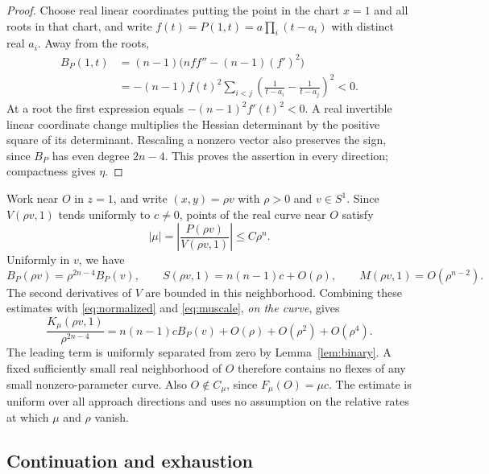 \documentclass[11pt,a4paper]{article}
\theoremstyle{remark}
\begin{document}
\begin{proof}
Choose real linear coordinates putting the point in the chart \(x=1\)
and all roots in that chart, and write
\(f(t)=P(1,t)=a\prod_i(t-a_i)\) with distinct real \(a_i\).
Away from the roots,
\begin{equation}\label{eq:binary}
\begin{split}
 B_P(1,t)&=(n-1)\bigl(nff''-(n-1)(f')^2\bigr)\\
 & =-(n-1)f(t)^2\sum_{i<j}
       \left(\frac1{t-a_i}-\frac1{t-a_j}\right)^2<0.
\end{split}
\end{equation}
At a root the first expression equals
\(-(n-1)^2f'(t)^2<0\). A real invertible linear coordinate change
multiplies the Hessian determinant by the positive square of its
determinant. Rescaling a nonzero vector also preserves the sign,
since \(B_P\) has even degree \(2n-4\). This proves the assertion
in every direction; compactness gives \(\eta\).
\end{proof}

Work near \(O\) in \(z=1\), and write \((x,y)=\rho v\) with
\(\rho>0\) and \(v\in S^1\). Since \(V(\rho v,1)\) tends uniformly
to \(c\ne0\), points of the real curve near \(O\) satisfy
\begin{equation}\label{eq:muscale}
 |\mu|=\left|\frac{P(\rho v)}{V(\rho v,1)}\right|
                 \leq C\rho^n.
\end{equation}
Uniformly in \(v\), we have
\[
 B_P(\rho v)=\rho^{2n-4}B_P(v),\qquad
 S(\rho v,1)=n(n-1)c+O(\rho),\qquad
 M(\rho v,1)=O(\rho^{n-2}).
\]
The second derivatives of \(V\) are bounded in this neighborhood.
Combining these estimates with \eqref{eq:normalized} and
\eqref{eq:muscale}, \emph{on the curve}, gives
\begin{equation}\label{eq:central}
 \frac{K_\mu(\rho v,1)}{\rho^{2n-4}}
 =n(n-1)cB_P(v)+O(\rho)+O(\rho^2)+O(\rho^4).
\end{equation}
The leading term is uniformly separated from zero by
Lemma~\ref{lem:binary}. A fixed sufficiently small real neighborhood
of \(O\) therefore contains no flexes of any small nonzero-parameter
curve. Also \(O\notin C_\mu\), since \(F_\mu(O)=\mu c\).
The estimate is uniform over all approach directions and uses no
assumption on the relative rates at which \(\mu\) and \(\rho\) vanish.

\subsection{Continuation and exhaustion}
\end{document}
